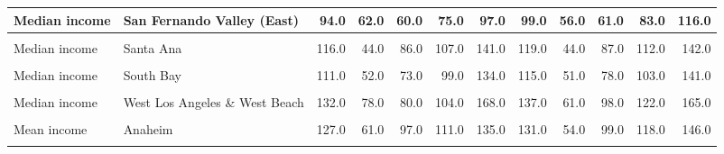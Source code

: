 \begin{table}[!h]
\begin{tabular}[t]{l|>{}l||r|r|r|r|r|r|r|r|r|r}
\hline
Median income & San Fernando Valley (East) & 94.0 & 62.0 & 60.0 & 75.0 & 97.0 & 99.0 & 56.0 & 61.0 & 83.0 & 116.0\\
\hline
\cellcolor{gray!6}{Median income} & \cellcolor{gray!6}{San Fernando Valley (West)} & \cellcolor{gray!6}{124.0} & \cellcolor{gray!6}{52.0} & \cellcolor{gray!6}{87.0} & \cellcolor{gray!6}{113.0} & \cellcolor{gray!6}{156.0} & \cellcolor{gray!6}{121.0} & \cellcolor{gray!6}{46.0} & \cellcolor{gray!6}{87.0} & \cellcolor{gray!6}{116.0} & \cellcolor{gray!6}{146.0}\\
\hline
Median income & Santa Ana & 116.0 & 44.0 & 86.0 & 107.0 & 141.0 & 119.0 & 44.0 & 87.0 & 112.0 & 142.0\\
\hline
\cellcolor{gray!6}{Median income} & \cellcolor{gray!6}{South \& South Central Los Angeles} & \cellcolor{gray!6}{59.0} & \cellcolor{gray!6}{23.0} & \cellcolor{gray!6}{44.0} & \cellcolor{gray!6}{55.0} & \cellcolor{gray!6}{68.0} & \cellcolor{gray!6}{67.0} & \cellcolor{gray!6}{27.0} & \cellcolor{gray!6}{50.0} & \cellcolor{gray!6}{62.0} & \cellcolor{gray!6}{78.0}\\
\hline
Median income & South Bay & 111.0 & 52.0 & 73.0 & 99.0 & 134.0 & 115.0 & 51.0 & 78.0 & 103.0 & 141.0\\
\hline
\cellcolor{gray!6}{Median income} & \cellcolor{gray!6}{South Orange Co} & \cellcolor{gray!6}{140.0} & \cellcolor{gray!6}{49.0} & \cellcolor{gray!6}{104.0} & \cellcolor{gray!6}{137.0} & \cellcolor{gray!6}{167.0} & \cellcolor{gray!6}{142.0} & \cellcolor{gray!6}{46.0} & \cellcolor{gray!6}{109.0} & \cellcolor{gray!6}{140.0} & \cellcolor{gray!6}{171.0}\\
\hline
Median income & West Los Angeles \& West Beach & 132.0 & 78.0 & 80.0 & 104.0 & 168.0 & 137.0 & 61.0 & 98.0 & 122.0 & 165.0\\
\hline
\cellcolor{gray!6}{Median income} & \cellcolor{gray!6}{Whittier \& North Orange Co} & \cellcolor{gray!6}{101.0} & \cellcolor{gray!6}{29.0} & \cellcolor{gray!6}{80.0} & \cellcolor{gray!6}{94.0} & \cellcolor{gray!6}{116.0} & \cellcolor{gray!6}{105.0} & \cellcolor{gray!6}{30.0} & \cellcolor{gray!6}{85.0} & \cellcolor{gray!6}{101.0} & \cellcolor{gray!6}{121.0}\\
\hline
Mean income & Anaheim & 127.0 & 61.0 & 97.0 & 111.0 & 135.0 & 131.0 & 54.0 & 99.0 & 118.0 & 146.0\\
\hline
\hline
\cellcolor{gray!6}{Mean income} & \cellcolor{gray!6}{Covina \& West Covina} & \cellcolor{gray!6}{126.0} & \cellcolor{gray!6}{44.0} & \cellcolor{gray!6}{95.0} & \cellcolor{gray!6}{116.0} & \cellcolor{gray!6}{144.0} & \cellcolor{gray!6}{125.0} & \cellcolor{gray!6}{42.0} & \cellcolor{gray!6}{100.0} & \cellcolor{gray!6}{115.0} & \cellcolor{gray!6}{143.0}\\

\end{tabular}
\end{table}
